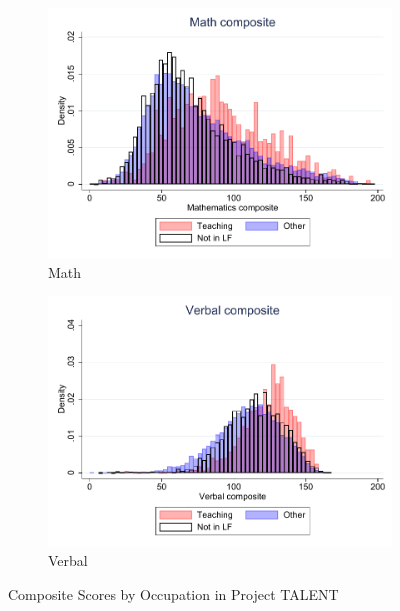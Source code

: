 \documentclass[onehalfspacing,11pt]{article}
\begin{document}
\begin{figure}
	\begin{subfigure}{0.49\textwidth}
		\includegraphics[width=\linewidth]{TALENT_math_occ.pdf}
		\caption{Math} \label{fig:talentmath}
	\end{subfigure}
	\hspace*{\fill} %
	\begin{subfigure}{0.49\textwidth}
		\includegraphics[width=\linewidth]{TALENT_verb_occ.pdf}
		\caption{Verbal} \label{fig:talentverb}
	\end{subfigure}
	\caption{Composite Scores by Occupation in Project TALENT} \label{fig:talent}
\end{figure}
\end{document}
